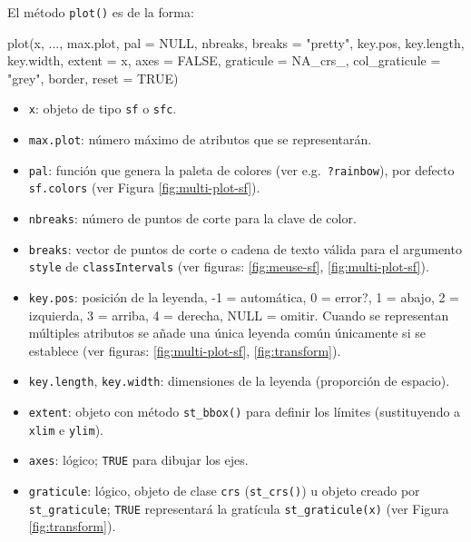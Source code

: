 \documentclass[
  spanish,
]{book}
\newenvironment{Shaded}{\begin{snugshade}}{\end{snugshade}}
\newcommand{\AttributeTok}[1]{\textcolor[rgb]{0.77,0.63,0.00}{#1}}
\newcommand{\ConstantTok}[1]{\textcolor[rgb]{0.00,0.00,0.00}{#1}}
\newcommand{\FunctionTok}[1]{\textcolor[rgb]{0.00,0.00,0.00}{#1}}
\newcommand{\NormalTok}[1]{#1}
\newcommand{\StringTok}[1]{\textcolor[rgb]{0.31,0.60,0.02}{#1}}
\providecommand{\tightlist}{%
  \setlength{\itemsep}{0pt}\setlength{\parskip}{0pt}}
\theoremstyle{break}
\theoremstyle{definition}
\theoremstyle{definition}
\theoremstyle{definition}
\theoremstyle{definition}
\theoremstyle{remark}
\begin{document}
El método \texttt{plot()} es de la forma:

\begin{Shaded}
\begin{Highlighting}[]
\FunctionTok{plot}\NormalTok{(x, ..., max.plot, }\AttributeTok{pal =} \ConstantTok{NULL}\NormalTok{, nbreaks, }\AttributeTok{breaks =} \StringTok{"pretty"}\NormalTok{, }
\NormalTok{     key.pos, key.length, key.width, }\AttributeTok{extent =}\NormalTok{ x, }\AttributeTok{axes =} \ConstantTok{FALSE}\NormalTok{, }
     \AttributeTok{graticule =}\NormalTok{ NA\_crs\_, }\AttributeTok{col\_graticule =} \StringTok{"grey"}\NormalTok{, border, }\AttributeTok{reset =} \ConstantTok{TRUE}\NormalTok{)}
\end{Highlighting}
\end{Shaded}

\begin{itemize}
\tightlist
\item
  \texttt{x}: objeto de tipo \texttt{sf} o \texttt{sfc}.
\item
  \texttt{max.plot}: número máximo de atributos que se representarán.
\item
  \texttt{pal}: función que genera la paleta de colores (ver e.g.~\texttt{?rainbow}), por defecto \texttt{sf.colors} (ver Figura \ref{fig:multi-plot-sf}).
\item
  \texttt{nbreaks}: número de puntos de corte para la clave de color.
\item
  \texttt{breaks}: vector de puntos de corte o cadena de texto válida para el argumento \texttt{style} de \texttt{classIntervals} (ver figuras: \ref{fig:meuse-sf}, \ref{fig:multi-plot-sf}).
\item
  \texttt{key.pos}: posición de la leyenda, -1 = automática, 0 = error?, 1 = abajo, 2 = izquierda, 3 = arriba, 4 = derecha, NULL = omitir. Cuando se representan múltiples atributos se añade una única leyenda común únicamente si se establece (ver figuras: \ref{fig:multi-plot-sf}, \ref{fig:transform}).
\item
  \texttt{key.length}, \texttt{key.width}: dimensiones de la leyenda (proporción de espacio).
\item
  \texttt{extent}: objeto con método \texttt{st\_bbox()} para definir los límites (sustituyendo a \texttt{xlim} e \texttt{ylim}).
\item
  \texttt{axes}: lógico; \texttt{TRUE} para dibujar los ejes.
\item
  \texttt{graticule}: lógico, objeto de clase \texttt{crs} (\texttt{st\_crs()}) u objeto creado por \texttt{st\_graticule}; \texttt{TRUE} representará la gratícula \texttt{st\_graticule(x)} (ver Figura \ref{fig:transform}).

\end{itemize}
\end{document}
